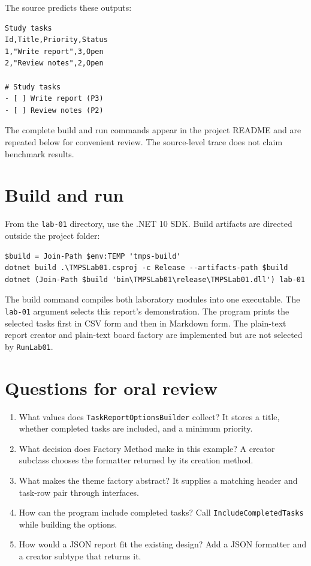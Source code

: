 \documentclass{utmreport}
\begin{document}
The source predicts these outputs:
\begin{lstlisting}
Study tasks
Id,Title,Priority,Status
1,"Write report",3,Open
2,"Review notes",2,Open

# Study tasks
- [ ] Write report (P3)
- [ ] Review notes (P2)
\end{lstlisting}

The complete build and run commands appear in the project README and are repeated below for convenient review. The source-level trace does not claim benchmark results.

\clearpage
\section{Build and run}
From the \texttt{lab-01} directory, use the .NET 10 SDK. Build artifacts are directed outside the project folder:
\begin{lstlisting}
$build = Join-Path $env:TEMP 'tmps-build'
dotnet build .\TMPSLab01.csproj -c Release --artifacts-path $build
dotnet (Join-Path $build 'bin\TMPSLab01\release\TMPSLab01.dll') lab-01
\end{lstlisting}

The build command compiles both laboratory modules into one executable. The \texttt{lab-01} argument selects this report's demonstration. The program prints the selected tasks first in CSV form and then in Markdown form. The plain-text report creator and plain-text board factory are implemented but are not selected by \texttt{RunLab01}.

\section{Questions for oral review}
\begin{enumerate}
\item What values does \texttt{TaskReportOptionsBuilder} collect? It stores a title, whether completed tasks are included, and a minimum priority.
\item What decision does Factory Method make in this example? A creator subclass chooses the formatter returned by its creation method.
\item What makes the theme factory abstract? It supplies a matching header and task-row pair through interfaces.
\item How can the program include completed tasks? Call \texttt{IncludeCompletedTasks} while building the options.
\item How would a JSON report fit the existing design? Add a JSON formatter and a creator subtype that returns it.
\end{enumerate}
\end{document}
